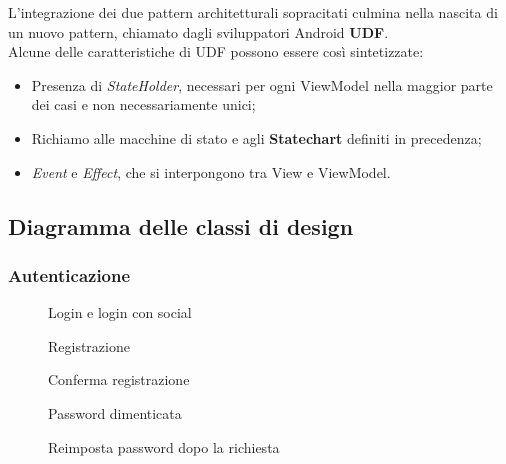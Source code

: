 \documentclass{natourDoc}
\begin{document}
L'integrazione dei due pattern architetturali sopracitati culmina nella nascita di un nuovo pattern, chiamato dagli sviluppatori Android \textbf{UDF}.\\
Alcune delle caratteristiche di UDF possono essere così sintetizzate:
\begin{itemize}
	\item Presenza di \textit{StateHolder}, necessari per ogni ViewModel nella maggior parte dei casi e non necessariamente unici;
	\item Richiamo alle macchine di stato e agli \textbf{Statechart} definiti in precedenza;
	\item \textit{Event} e \textit{Effect}, che si interpongono tra View e ViewModel.
\end{itemize} 

\newpage
\subsection{Diagramma delle classi di design}
\subsubsection{Autenticazione}
\begin{figure}[!htbp]
	\centering
	
	\caption{Login e login con social}
\end{figure}
\FloatBarrier

\begin{figure}[!htbp]
	\centering
	
	\caption{Registrazione}
\end{figure}
\FloatBarrier

\begin{figure}[!htbp]
	\centering
	
	\caption{Conferma registrazione}
\end{figure}
\FloatBarrier

\begin{figure}[!htbp]
	\centering
	
	\caption{Password dimenticata}
\end{figure}
\FloatBarrier

\begin{figure}[!htbp]
	\centering
	
	\caption{Reimposta password dopo la richiesta}
\end{figure}
\FloatBarrier
\end{document}
